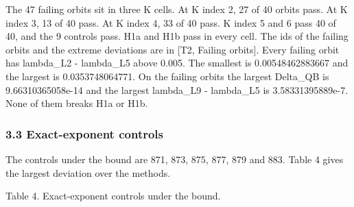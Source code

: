 \documentclass[
  11pt,
]{article}
\begin{document}
The 47 failing orbits sit in three K cells. At K index 2, 27 of 40
orbits pass. At K index 3, 13 of 40 pass. At K index 4, 33 of 40 pass. K
index 5 and 6 pass 40 of 40, and the 9 controls pass. H1a and H1b pass
in every cell. The ids of the failing orbits and the extreme deviations
are in {[}T2, Failing orbits{]}. Every failing orbit has
\textbar lambda\_L2 - lambda\_L5\textbar{} above 0.005. The smallest is
0.00548462883667 and the largest is 0.0353748064771. On the failing
orbits the largest Delta\_QB is 9.66310365058e-14 and the largest
\textbar lambda\_L9 - lambda\_L5\textbar{} is 3.58331395889e-7. None of
them breaks H1a or H1b.

\subsubsection{3.3 Exact-exponent
controls}\label{exact-exponent-controls}

The controls under the bound are 871, 873, 875, 877, 879 and 883. Table
4 gives the largest deviation over the methods.

Table 4. Exact-exponent controls under the bound.
\end{document}
